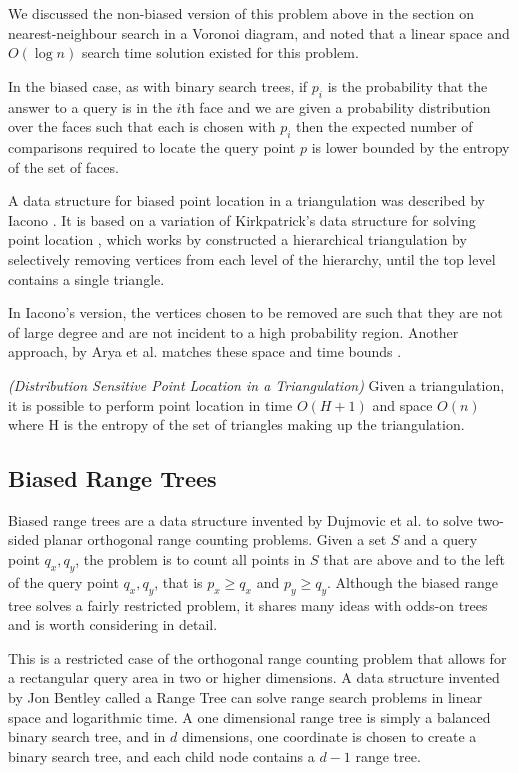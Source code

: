 \documentclass[mcs]{scsthesis}
\begin{document}
We discussed the non-biased version of this problem above in the section on
nearest-neighbour search in a Voronoi diagram, and noted that a linear space
and \(O(\log n)\) search time solution existed for this problem.

In the biased case, as with binary search trees, if \(p_i\) is the probability
that the answer to a query is in the \(i\)th face and we are given a probability
distribution over the faces such that each is chosen with \(p_i\) then the
expected number of comparisons required to locate the query point \(p\) is
lower bounded by the entropy of the set of faces.

A data structure for biased point location in a triangulation was described
by Iacono \cite{iacono}. It is based on a variation of Kirkpatrick's data
structure for solving point location \cite{kirkpatrick}, which works by
constructed a hierarchical triangulation by selectively removing vertices
from each level of the hierarchy, until the top level contains a single triangle.

In Iacono's version, the vertices chosen to be removed are such that they are
not of large degree and are not incident to a high probability region. Another
approach, by Arya et al. matches these space and time bounds \cite{simpleentropy}.

\begin{thm} \emph{(Distribution Sensitive Point Location in a Triangulation)} 
Given a triangulation, it is possible to perform point location in time
\(O(H + 1)\) and space \(O(n)\) where H is the entropy of the set of triangles
making up the triangulation. 
\end{thm}

\subsection{Biased Range Trees}

Biased range trees are a data structure invented by Dujmovic et al.
\cite{biasedrange} to solve two-sided planar orthogonal range counting problems.
Given a set \(S\) and a query point \(q_x, q_y\), the problem is to count all
points in \(S\) that are above and to the left of the query point
\(q_x, q_y\), that is \(p_x \ge q_x\) and \(p_y \ge q_y\). Although the biased
range tree solves a fairly restricted problem, it shares many ideas with odds-on
trees and is worth considering in detail.

This is a restricted case of the orthogonal range counting problem that allows
for a rectangular query area in two or higher dimensions. A data structure
invented by Jon Bentley \cite{rangetree} called a Range Tree can solve range
search problems in linear space and logarithmic time. A one dimensional range
tree is simply a balanced binary search tree, and in \(d\) dimensions, one
coordinate is chosen to create a binary search tree, and each child node
contains a \(d - 1\) range tree. 
\end{document}
